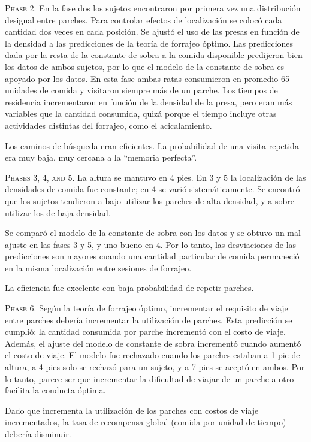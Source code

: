 \documentclass[a4paper,12pt]{article}
\begin{document}
{\scshape Phase 2.} En la fase dos los sujetos encontraron por primera vez una distribución desigual entre parches. Para controlar efectos de localización se colocó cada cantidad dos veces en cada posición. Se ajustó el uso de las presas en función de la densidad a las predicciones de la teoría de forrajeo óptimo. Las predicciones dada por la resta de la constante de sobra a la comida disponible predijeron bien los datos de ambos sujetos, por lo que el modelo de la constante de sobra es apoyado por los datos. En esta fase ambas ratas consumieron en promedio 65 unidades de comida y visitaron siempre más de un parche. Los tiempos de residencia incrementaron en función de la densidad de la presa, pero eran más variables que la cantidad consumida, quizá porque el tiempo incluye otras actividades distintas del forrajeo, como el acicalamiento. 

Los caminos de búsqueda eran eficientes. La probabilidad de una visita repetida era muy baja, muy cercana a la ``memoria perfecta''.

{\scshape Phases 3, 4, and 5.} La altura se mantuvo en 4 pies. En 3 y 5 la localización de las densidades de comida fue constante; en 4 se varió sistemáticamente. Se encontró que los sujetos tendieron a bajo-utilizar los parches de alta densidad, y a sobre-utilizar los de baja densidad.

Se comparó el modelo de la constante de sobra con los datos y se obtuvo un mal ajuste en las fases 3 y 5, y uno bueno en 4. Por lo tanto, las desviaciones de las predicciones son mayores cuando una cantidad particular de comida permaneció en la misma localización entre sesiones de forrajeo.

La eficiencia fue excelente con baja probabilidad de repetir parches.

{\scshape Phase 6.} Según la teoría de forrajeo óptimo, incrementar el requisito de viaje entre parches debería incrementar la utilización de parches. Esta predicción se cumplió: la cantidad consumida por parche incrementó con el costo de viaje. Además, el ajuste del modelo de constante de sobra incrementó cuando aumentó el costo de viaje. El modelo fue rechazado cuando los parches estaban a 1 pie de altura, a 4 pies solo se rechazó para un sujeto, y a 7 pies se aceptó en ambos. Por lo tanto, parece ser que incrementar la dificultad de viajar de un parche a otro facilita la conducta óptima.

Dado que incrementa la utilización de los parches con costos de viaje incrementados, la tasa de recompensa global (comida por unidad de tiempo) debería disminuir.
\end{document}

